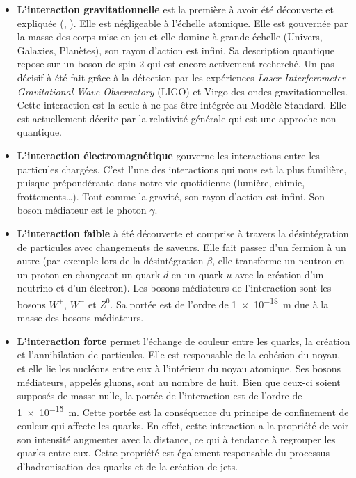 \begin{itemize}[label=$\bullet$]
\item \textbf{L'interaction gravitationnelle} est la première à avoir été découverte et expliquée (, ). Elle est négligeable à l'échelle atomique. Elle est gouvernée par la masse des corps mise en jeu et elle domine à grande échelle (Univers, Galaxies, Planètes), son rayon d'action est infini. Sa description quantique repose sur un boson de spin \num{2} qui est encore activement recherché. Un pas décisif à été fait grâce à la détection par les expériences \textit{Laser Interferometer Gravitational-Wave Observatory} (LIGO) et Virgo des ondes gravitationnelles. Cette interaction est la seule à ne pas être intégrée au Modèle Standard. Elle est actuellement décrite par la relativité générale qui est une approche non quantique.

\item \textbf{L'interaction électromagnétique} gouverne les interactions entre les particules chargées. C'est l'une des interactions qui nous est la plus familière, puisque prépondérante dans notre vie quotidienne (lumière, chimie, frottements\ldots). Tout comme la gravité, son rayon d'action est infini. Son boson médiateur est le photon $\gamma$.

\item \textbf{L'interaction faible} à été découverte et comprise à travers la désintégration de particules avec changements de saveurs. Elle fait passer d'un fermion à un autre (par exemple lors de la désintégration $\beta$, elle transforme un neutron en un proton en changeant un quark $d$ en un quark $u$ avec la création d'un neutrino et d'un électron). Les bosons médiateurs de l'interaction sont les bosons $W^{+}$, $W^{-}$ et $Z^{0}$. Sa portée est de l'ordre de \SI{1e-18}{\meter} due à la masse des bosons médiateurs.

\item \textbf{L'interaction forte} permet l'échange de couleur entre les quarks, la création et l'annihilation de particules. Elle est responsable de la cohésion du noyau, et elle lie les nucléons entre eux à l'intérieur du noyau atomique. Ses bosons médiateurs, appelés gluons, sont au nombre de huit. Bien que ceux-ci soient supposés de masse nulle, la portée de l'interaction est de l'ordre de \SI{1e-15}{\meter}. Cette portée est la conséquence du principe de confinement de couleur qui affecte les quarks. En effet, cette interaction a la propriété de voir son intensité augmenter avec la distance, ce qui à tendance à regrouper les quarks entre eux. Cette propriété est également responsable du processus d'hadronisation des quarks et de la création de jets.
\end{itemize}

